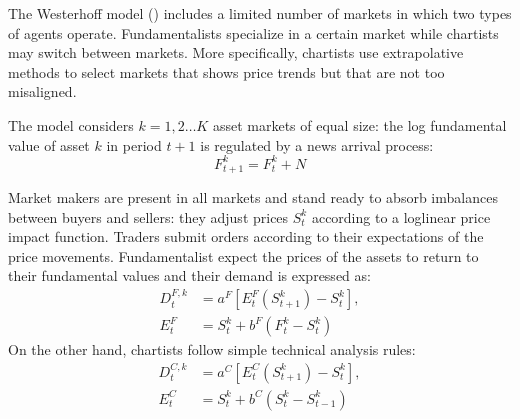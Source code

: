 \documentclass[runningheads]{llncs}
\begin{document}
The Westerhoff model (\cite{westerhoff2004}) includes a limited number of markets in which two types of agents operate. Fundamentalists specialize in a certain market while chartists may switch between markets. More specifically, chartists use extrapolative methods to select markets that shows price trends but that are not too misaligned.

The model considers $k = 1,2\dots K$ asset markets of equal size: the log fundamental value of asset $k$ in period $t + 1$ is regulated by a news arrival process:
\begin{equation*}
F_{t+1}^k = F_t^k + N
\end{equation*}

Market makers are present in all markets and stand ready to absorb imbalances between buyers and sellers: they adjust prices $S^k_t$ according to a loglinear price impact function.
Traders submit orders according to their expectations of the price movements. Fundamentalist expect the prices of the assets to return to their fundamental values and their demand is expressed as:
\begin{align*}
D_t^{F,k} &= a^F[E_t^F(S^k_{t+1}) - S^k_{t}],\\
E_t^F &= S^k_{t} + b^F(F_t^k - S^k_t)
\end{align*}
On the other hand, chartists follow simple technical analysis rules:
\begin{align*}
D_t^{C,k} &= a^C[E_t^C(S^k_{t+1}) - S^k_{t}],\\
E_t^C &= S^k_{t} + b^C(S_t^k - S^k_{t-1})
\end{align*}
\end{document}
